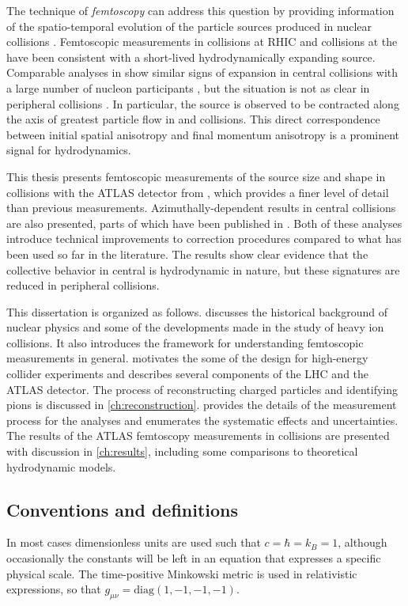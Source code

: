 The technique of \emph{femtoscopy} can address this question by providing information of the spatio-temporal evolution of the particle sources produced in nuclear collisions \cite{Lisa:2005dd}.
Femtoscopic measurements in \AuAu collisions at \ac{RHIC} and \PbPb collisions at the \lhc have been consistent with a short-lived hydrodynamically expanding source.
Comparable analyses in \pPb show similar signs of expansion in central collisions with a large number of nucleon participants \Npart, but the situation is not as clear in peripheral collisions \cite{Abelev:2014pja,Adam:2015pya}.
In particular, the source is observed to be contracted along the axis of greatest particle flow in \AuAu \cite{Adams:2003ra,Adare:2014vax,Adamczyk:2014mxp} and \PbPb \cite{Adamova:2017opl} collisions.
This direct correspondence between initial spatial anisotropy and final momentum anisotropy is a prominent signal for hydrodynamics.

This thesis presents femtoscopic measurements of the source size and shape in \pPb collisions with the ATLAS detector from , which provides a finer level of detail than previous measurements.
Azimuthally-dependent results in central \pPb collisions are also presented, parts of which have been published in .
Both of these analyses introduce technical improvements to correction procedures compared to what has been used so far in the literature.
The results show clear evidence that the collective behavior in central \pPb is hydrodynamic in nature, but these signatures are reduced in peripheral collisions.

This dissertation is organized as follows.
 discusses the historical background of nuclear physics and some of the developments made in the study of heavy ion collisions.
It also introduces the framework for understanding femtoscopic measurements in general.
 motivates the some of the design for high-energy collider experiments and describes several components of the \ac{LHC} and the ATLAS detector.
The process of reconstructing charged particles and identifying pions is discussed in \cref{ch:reconstruction}.
 provides the details of the measurement process for the analyses and enumerates the systematic effects and uncertainties.
The results of the ATLAS femtoscopy measurements in \pPb collisions are presented with discussion in \cref{ch:results}, including some comparisons to theoretical hydrodynamic models.

\subsection*{Conventions and definitions}
In most cases dimensionless units are used such that $c = \hbar = k_B = 1$, although occasionally the constants will be left in an equation that expresses a specific physical scale. The time-positive Minkowski metric is used in relativistic expressions, so that $g_{\mu\nu} = \mathrm{diag}\left( 1, -1, -1, -1\right)$.

